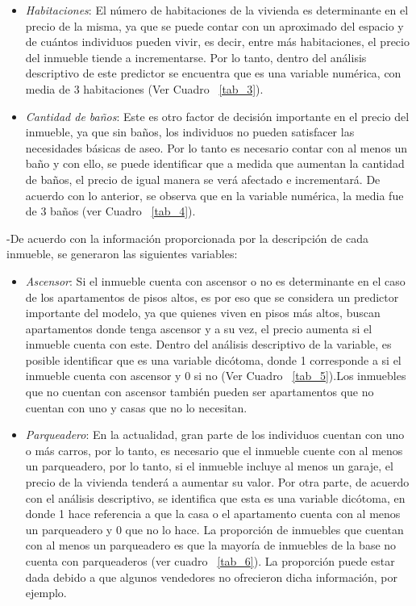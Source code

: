 \documentclass[conference, 10pt]{IEEEtran}
\begin{document}
\begin{itemize}
\item \textit{Habitaciones}: El número de habitaciones de la vivienda es determinante en el precio de la misma, ya que se puede contar con un aproximado del espacio y de cuántos individuos pueden vivir, es decir, entre más habitaciones, el precio del inmueble tiende a incrementarse. Por lo tanto, dentro del análisis descriptivo de este predictor se encuentra que es  una variable numérica, con media de 3 habitaciones (Ver Cuadro ~\ref{tab_3}).
\item \textit{Cantidad de baños}: Este es otro factor de decisión importante en el precio del inmueble, ya que sin baños, los individuos no pueden satisfacer las necesidades básicas de aseo. Por lo tanto es necesario contar con al menos un baño y con ello, se puede identificar que a medida que aumentan la cantidad de baños, el precio de igual manera se verá afectado e incrementará. De acuerdo con lo anterior, se observa que en la variable numérica, la media fue de 3 baños (ver Cuadro ~\ref{tab_4}).
\end{itemize}

-De acuerdo con la información proporcionada por la descripción de cada inmueble, se generaron las siguientes variables:

\begin{itemize}
\item \textit{Ascensor}: Si el inmueble cuenta con ascensor o no es determinante en el caso de los apartamentos de pisos altos, es por eso que se considera un predictor importante del modelo, ya que quienes viven en pisos más altos, buscan apartamentos donde tenga ascensor y a su vez, el precio aumenta si el inmueble cuenta con este. Dentro del análisis descriptivo de la variable, es posible identificar que es una variable dicótoma, donde 1 corresponde a si el inmueble cuenta con ascensor y 0 si no (Ver Cuadro ~\ref{tab_5}).Los inmuebles que no cuentan con ascensor también pueden ser apartamentos que no cuentan con uno y casas que no lo necesitan.
\item \textit{Parqueadero}: En la actualidad, gran parte de los individuos cuentan con uno o más carros, por lo tanto, es necesario que el inmueble cuente con al menos un parqueadero, por lo tanto, si el inmueble incluye al menos un garaje, el precio de la vivienda tenderá a aumentar su valor. Por otra parte, de acuerdo con el análisis descriptivo, se identifica que esta es una variable dicótoma, en donde 1 hace referencia a que la casa o el apartamento cuenta con al menos un parqueadero y 0 que no lo hace. La proporción de inmuebles que cuentan con al menos un parqueadero es que la mayoría de inmuebles de la base no cuenta con parqueaderos (ver cuadro ~\ref{tab_6}). La proporción puede estar dada debido a que algunos vendedores no ofrecieron dicha información, por ejemplo.
\end{itemize}
 
\end{document}
